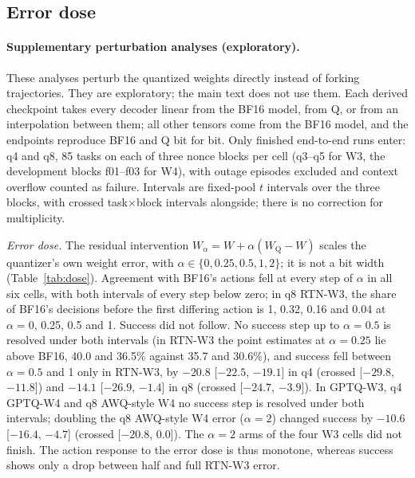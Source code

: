 \subsection{Error dose}
\label{app:dose}

\paragraph{Supplementary perturbation analyses (exploratory).} These analyses perturb the quantized weights directly instead of forking trajectories. They are exploratory; the main text does not use them. Each derived checkpoint takes every decoder linear from the BF16 model, from Q, or from an interpolation between them; all other tensors come from the BF16 model, and the endpoints reproduce BF16 and Q bit for bit. %
Only finished end-to-end runs enter: q4 and q8, 85 tasks on each of three nonce blocks per cell (q3--q5 for W3, the development blocks f01--f03 for W4), with outage episodes excluded and context overflow counted as failure. Intervals are fixed-pool $t$ intervals over the three blocks, with crossed task$\times$block intervals alongside; there is no correction for multiplicity. %

\emph{Error dose.} The residual intervention $W_\alpha=W+\alpha(W_{\mathrm{Q}}-W)$ scales the quantizer's own weight error, with $\alpha\in\{0, 0.25, 0.5, 1, 2\}$; it is not a bit width (Table~\ref{tab:dose}). %
Agreement with BF16's actions fell at every step of $\alpha$ in all six cells, with both intervals of every step below zero; in q8 RTN-W3, the share of BF16's decisions before the first differing action is 1, 0.32, 0.16 and 0.04 at $\alpha=0$, 0.25, 0.5 and 1. Success did not follow. No success step up to $\alpha=0.5$ is resolved under both intervals (in RTN-W3 the point estimates at $\alpha=0.25$ lie above BF16, 40.0 and 36.5\% against 35.7 and 30.6\%), and success fell between $\alpha=0.5$ and 1 only in RTN-W3, by $-20.8$ [$-22.5$, $-19.1$]\pp{} in q4 (crossed [$-29.8$, $-11.8$]) and $-14.1$ [$-26.9$, $-1.4$] in q8 (crossed [$-24.7$, $-3.9$]). %
In GPTQ-W3, q4 GPTQ-W4 and q8 AWQ-style W4 no success step is resolved under both intervals; doubling the q8 AWQ-style W4 error ($\alpha=2$) changed success by $-10.6$ [$-16.4$, $-4.7$]\pp{} (crossed [$-20.8$, $0.0$]). The $\alpha=2$ arms of the four W3 cells did not finish. The action response to the error dose is thus monotone, whereas success shows only a drop between half and full RTN-W3 error. %

